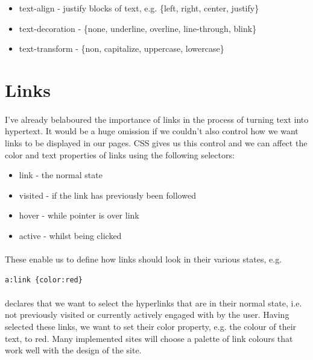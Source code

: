 \begin{itemize}
	\item text-align - justify blocks of text, e.g. \{left, right, center, justify\}
	\item text-decoration - \{none, underline, overline, line-through, blink\}
	\item text-transform - \{non, capitalize, uppercase, lowercase\}
\end{itemize}



\section{Links}
\paragraph{} I've already belaboured the importance of links in the process of turning text into hypertext. It would be a huge omission if we couldn't also control how we want links to be displayed in our pages. CSS gives us this control and we can affect the color and text properties of links using the following selectors:

\begin{itemize}
	\item link - the normal state
	\item visited - if the link has previously been followed
	\item hover - while pointer is over link
	\item active - whilst being clicked
\end{itemize}

\paragraph{} These enable us to define how links should look in their various states, e.g. 

\begin{lstlisting}
a:link {color:red}
\end{lstlisting}

\paragraph{} declares that we want to select the hyperlinks that are in their normal state, i.e. not previously visited or currently actively engaged with by the user. Having selected these links, we want to set their color property, e.g. the colour of their text, to red. Many implemented sites will choose a palette of link colours that work well with the design of the site.



